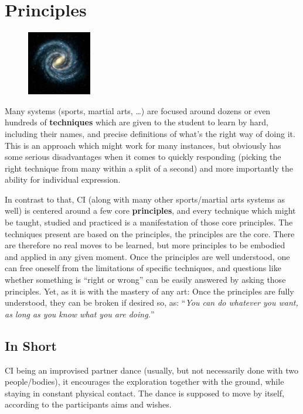\section{Principles}\label{sec:principles}

\begin{figure}
    \centering
    \includegraphics[width=0.25\textwidth]{images/principles}
\end{figure}

Many systems (sports, martial arts, \ldots) are focused around dozens or even hundreds of \textbf{techniques} which are given to the student to learn by hard, including their names, and precise definitions of what's the right way of doing it.
This is an approach which might work for many instances, but obviously has some serious disadvantages when it comes to quickly responding (picking the right technique from many within a split of a second) and more importantly the ability for individual expression.

In contrast to that, CI (along with many other sports/martial arts systems as well) is centered around a few core \textbf{principles}, and every technique which might be taught, studied and practiced is a manifestation of those core principles.
The techniques present are based on the principles, the principles are the core.
There are therefore no real moves to be learned, but more principles to be embodied and applied in any given moment.
Once the principles are well understood, one can free oneself from the limitations of specific techniques, and questions like whether something is ``right or wrong'' can be easily answered by asking those principles.
Yet, as it is with the mastery of any art: Once the principles are fully understood, they can be broken if desired so, as: ``\textit{You can do whatever you want, as long as you know what you are doing.}''

\subsection{In Short}\label{subsec:in-short}

CI being an improvised partner dance (usually, but not necessarily done with two people/bodies), it encourages the exploration together with the ground, while staying in constant physical contact.
The dance is supposed to move by itself, according to the participants aims and wishes.


